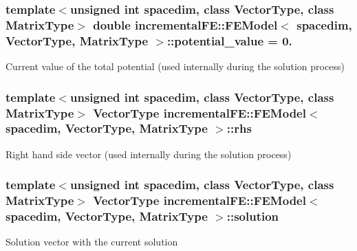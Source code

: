 \subsubsection[{\texorpdfstring{potential\+\_\+value}{potential_value}}]{\setlength{\rightskip}{0pt plus 5cm}template$<$unsigned int spacedim, class Vector\+Type, class Matrix\+Type$>$ double {\bf incremental\+F\+E\+::\+F\+E\+Model}$<$ spacedim, {\bf Vector\+Type}, Matrix\+Type $>$\+::potential\+\_\+value = 0.\hspace{0.3cm}{\ttfamily [private]}}\hypertarget{classincremental_f_e_1_1_f_e_model_a6ea0377dc55d432c82bc7ccdd8201932}{}\label{classincremental_f_e_1_1_f_e_model_a6ea0377dc55d432c82bc7ccdd8201932}
Current value of the total potential (used internally during the solution process) 
\subsubsection[{\texorpdfstring{rhs}{rhs}}]{\setlength{\rightskip}{0pt plus 5cm}template$<$unsigned int spacedim, class Vector\+Type, class Matrix\+Type$>$ {\bf Vector\+Type} {\bf incremental\+F\+E\+::\+F\+E\+Model}$<$ spacedim, {\bf Vector\+Type}, Matrix\+Type $>$\+::rhs\hspace{0.3cm}{\ttfamily [private]}}\hypertarget{classincremental_f_e_1_1_f_e_model_ac14a70972f9d05ee4174070090b6f339}{}\label{classincremental_f_e_1_1_f_e_model_ac14a70972f9d05ee4174070090b6f339}
Right hand side vector (used internally during the solution process) 
\subsubsection[{\texorpdfstring{solution}{solution}}]{\setlength{\rightskip}{0pt plus 5cm}template$<$unsigned int spacedim, class Vector\+Type, class Matrix\+Type$>$ {\bf Vector\+Type} {\bf incremental\+F\+E\+::\+F\+E\+Model}$<$ spacedim, {\bf Vector\+Type}, Matrix\+Type $>$\+::solution\hspace{0.3cm}{\ttfamily [private]}}\hypertarget{classincremental_f_e_1_1_f_e_model_a47dd80ff66ec302a9854f522c8a7246d}{}\label{classincremental_f_e_1_1_f_e_model_a47dd80ff66ec302a9854f522c8a7246d}
Solution vector with the current solution 
